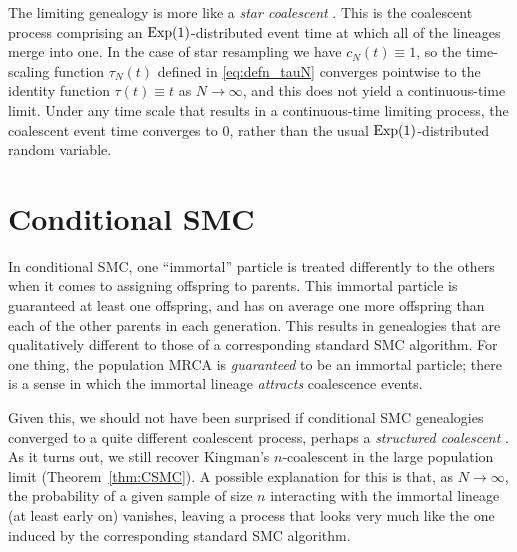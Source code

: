 The limiting genealogy is more like a \emph{star coalescent} \parencite{pitman1999, griffiths2016}. This is the coalescent process comprising an $\operatorname{Exp}(1)$-distributed event time at which all of the lineages merge into one.
In the case of star resampling we have $c_N(t) \equiv 1$, so the time-scaling function $\tau_N(t)$ defined in \eqref{eq:defn_tauN} converges pointwise to the identity function $\tau(t) \equiv t$ as $N\to\infty$, and this does not yield a continuous-time limit.
Under any time scale that results in a continuous-time limiting process, the coalescent event time converges to $0$, rather than the usual $\operatorname{Exp}(1)$-distributed random variable.






\section{Conditional SMC \seb{$\checkmark$} }
In conditional SMC, one ``immortal'' particle is treated differently to the others when it comes to assigning offspring to parents. This immortal particle is guaranteed at least one offspring, and has on average one more offspring than each of the other parents in each generation.
This results in genealogies that are qualitatively different to those of a corresponding standard SMC algorithm. For one thing, the population MRCA is \emph{guaranteed} to be an immortal particle; there is a sense in which the immortal lineage \emph{attracts} coalescence events.

Given this, we should not have been surprised if conditional SMC genealogies converged to a quite different coalescent process, perhaps a \emph{structured coalescent} \parencite{notohara1990}.
As it turns out, we still recover Kingman's $n$-coalescent in the large population limit (Theorem~\ref{thm:CSMC}). 
A possible explanation for this is that, as $N\to\infty$, the probability of a given sample of size $n$ interacting with the immortal lineage (at least early on) vanishes, leaving a process that looks very much like the one induced by the corresponding standard SMC algorithm.

